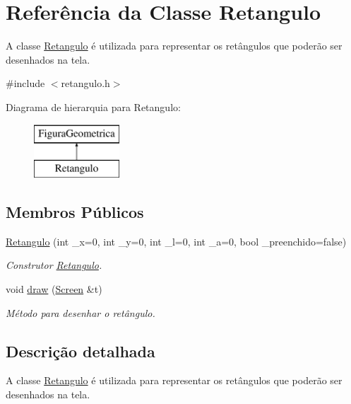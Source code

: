 \hypertarget{class_retangulo}{}\section{Referência da Classe Retangulo}
\label{class_retangulo}


A classe \mbox{\hyperlink{class_retangulo}{Retangulo}} é utilizada para representar os retângulos que poderão ser desenhados na tela.  




{\ttfamily \#include $<$retangulo.\+h$>$}

Diagrama de hierarquia para Retangulo\+:\begin{figure}[H]
\begin{center}
\leavevmode
\includegraphics[height=2.000000cm]{class_retangulo}
\end{center}
\end{figure}
\subsection*{Membros Públicos}
\begin{DoxyCompactItemize}
\item 
\mbox{\hyperlink{class_retangulo_a6c53c1dbd4fa3a699f688e29647397c8}{Retangulo}} (int \+\_\+x=0, int \+\_\+y=0, int \+\_\+l=0, int \+\_\+a=0, bool \+\_\+preenchido=false)
\begin{DoxyCompactList}\small\item\em Construtor \mbox{\hyperlink{class_retangulo}{Retangulo}}. \end{DoxyCompactList}\item 
void \mbox{\hyperlink{class_retangulo_ac088dd6d3f4f3d3f80363a868c2e74f1}{draw}} (\mbox{\hyperlink{class_screen}{Screen}} \&t)
\begin{DoxyCompactList}\small\item\em Método para desenhar o retângulo. \end{DoxyCompactList}\end{DoxyCompactItemize}


\subsection{Descrição detalhada}
A classe \mbox{\hyperlink{class_retangulo}{Retangulo}} é utilizada para representar os retângulos que poderão ser desenhados na tela. 

